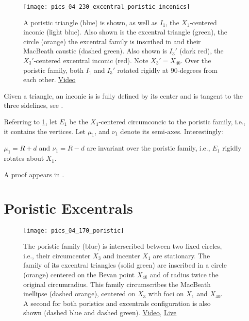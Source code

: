 \begin{figure}
    \centering
    \texttt{[image: pics\_04\_230\_excentral\_poristic\_inconics]}
    \caption{A poristic triangle (blue) is shown, as well as $I_1$, the $X_1$-centered inconic (light blue). Also shown is the excentral triangle (green), the circle (orange) the excentral family is inscribed in and their MacBeath caustic (dashed green). Also shown is $I_3'$ (dark red), the $X_3'$-centered excentral inconic (red). Note $X_3'=X_{40}$. Over the poristic family, both $I_1$ and $I_3'$ rotated rigidly at 90-degrees from each other. \href{https://youtu.be/hz0qEyVVvaI}{Video}}
    \label{fig:04-excentral-poristic-inconics}
\end{figure}

Given a triangle, an inconic is is fully defined by its center and is tangent to the three sidelines, see \cite[Inconic]{mw}.

Referring to \cref{fig:04-excentral-poristic-inconics}, let $E_1$ be the $X_1$-centered circumconcic to the poristic family, i.e., it contains the vertices. Let $\mu_1$, and $\nu_1$ denote its semi-axes. Interestingly:

\begin{proposition}
$\mu_1=R+d$ and $\nu_1=R-d$ are invariant over the poristic family, i.e., $E_1$ rigidly rotates about $X_1$. \label{prop:04-e1}
\end{proposition}

A proof appears in \cite[Appendix C]{garcia2020-similarity-I}.
\section{Poristic Excentrals}

\begin{figure}
    \centering
    \texttt{[image: pics\_04\_170\_poristic]}
    \caption{The poristic family (blue) is interscribed between two fixed circles, i.e., their circumcenter $X_3$ and incenter $X_1$ are stationary. The family of its excentral triangles (solid green) are inscribed in a circle (orange) centered on the Bevan point $X_{40}$ and of radius twice the original circumradius. This family circumscribes the MacBeath inellipse (dashed orange), centered on $X_3$ with foci on $X_1$ and $X_{40}$. A second for both poristics and excentrals configuration is also shown (dashed blue and dashed green).  \href{https://youtu.be/DS4ryndDK6Q}{Video}, \href{https://bit.ly/2RoYJHm}{Live}}
    \label{fig:04-poristic-excentrals}
\end{figure}

